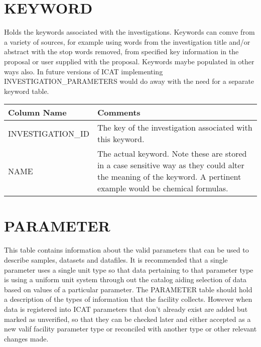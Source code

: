 \documentclass{report}
\begin{document}
\section{KEYWORD}

Holds the keywords associated with the investigations. Keywords can comve from a variety of sources, for example using words from the investigation title and/or abstract with the stop words removed, from specified key information in the proposal or user supplied with the proposal. Keywords maybe populated in other ways also. In future versions of ICAT implementing INVESTIGATION\_PARAMETERS would do away with the need for a separate keyword table.\\

\begin{tabular}{|l|l|}
\hline
Column Name & Comments \\ \hline
INVESTIGATION\_ID & \multicolumn{1}{p{100mm}|}{
The key of the investigation associated with this keyword.} \\ \hline
NAME & \multicolumn{1}{p{100mm}|}{
The actual keyword. Note these are stored in a case sensitive way as they could alter the meaning of the keyword. A pertinent example would be chemical formulas.} \\ \hline
\end{tabular}
\section{PARAMETER}

This table contains information about the valid parameters that can be used to describe samples, datasets and datafiles. It is recommended that a single parameter uses a single unit type so that data pertaining to that parameter type is using a uniform unit system through out the catalog aiding selection of data based on values of a particular parameter. The PARAMETER table should hold a description of the types of information that the facility collects. However when data is registered into ICAT parameters that don't already exist are added but marked as unverified, so that they can be checked later and either accepted as a new valif facility parameter type or reconciled with another type or other relevant changes made.\\
\end{document}
